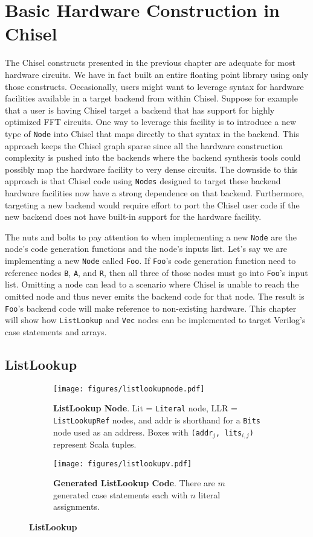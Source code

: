 \section{Basic Hardware Construction in Chisel}
\label{sec:basic}
The Chisel constructs presented in the previous chapter are adequate
for most hardware circuits. We have in fact built an entire floating
point library using only those constructs. Occasionally, users might
want to leverage syntax for hardware facilities available in a
target backend from within Chisel. Suppose for example that a user is
having Chisel target a backend that has support for highly optimized
FFT circuits. One way to leverage this facility is to introduce a new
type of {\tt Node} into Chisel that maps directly to that syntax in
the backend. This approach keeps the Chisel graph sparse since all the
hardware construction complexity is pushed into the backends where the
backend synthesis tools could possibly map the hardware facility to
very dense circuits. The downside to this approach is that Chisel code
using {\tt Nodes} designed to target these backend hardware facilities
now have a strong dependence on that backend. Furthermore, targeting a
new backend would require effort to port the Chisel user code if the
new backend does not have built-in support for the hardware facility.

The nuts and bolts to pay attention to when implementing a new 
{\tt Node} are the node's code generation functions and the node's
inputs list. Let's say we are implementing a new {\tt Node} called
{\tt Foo}. If {\tt Foo}'s code generation function need to reference
nodes {\tt B}, {\tt A}, and {\tt R}, then all three of those nodes
must go into {\tt Foo}'s input list. Omitting a node can lead to a
scenario where Chisel is unable to reach the omitted node and thus
never emits the backend code for that node. The result is 
{\tt Foo}'s backend code will make reference to non-existing hardware.
This chapter will show how {\tt ListLookup} and {\tt Vec} nodes can be
implemented to target Verilog's case statements and arrays.

\subsection{ListLookup}
\begin{figure}[htb]
\centering
  \begin{subfigure}[t]{0.48\textwidth}
  \centering
  \texttt{[image: figures/listlookupnode.pdf]}
  \caption{{\bf ListLookup Node}. Lit = {\tt Literal} node, LLR =
    {\tt ListLookupRef} nodes, and addr is shorthand for a {\tt Bits} node
    used as an address. Boxes with {\tt (addr$_j$,
      lits$_{i,j}$)} represent Scala tuples.}
  \label{fig:llnode}
  \end{subfigure}
  \hfill
  \begin{subfigure}[t]{0.48\textwidth}
  \centering
  \texttt{[image: figures/listlookupv.pdf]}
  \caption{{\bf Generated ListLookup Code}. There are $m$ generated
    case statements each with $n$ literal assignments.}
  \label{fig:llv}
  \end{subfigure}
\caption{{\bf ListLookup}}
\label{fig:ll}
\end{figure}

